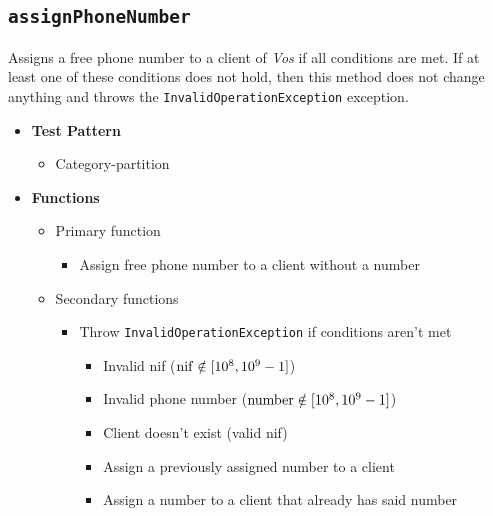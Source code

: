 \subsection{\texttt{assignPhoneNumber}}
\label{sec:methods.assignPhoneNumber}
Assigns a free phone number to a client of \textit{Vos} if all conditions are
met. If at least one of these conditions does not hold, then this method does
not change anything and throws the \texttt{InvalidOperationException} exception.
\begin{itemize}
  \large
  \item \textbf{Test Pattern}
  \begin{itemize}
    \normalsize
    \item Category-partition
  \end{itemize}

  \item \textbf{Functions}
  \begin{itemize}
    \normalsize
    \item Primary function
    \begin{itemize}
      \small
      \item Assign free phone number to a client without a number
    \end{itemize}
    \item Secondary functions
    \begin{itemize}
      \small
      \item Throw \texttt{InvalidOperationException} if conditions aren't met
        \begin{itemize}
          \footnotesize
          \item Invalid nif ($\rm{nif} \notin [10^8,10^9-1]$)
          \item Invalid phone number ($\rm{number} \notin [10^8,10^9-1]$)
          \item Client doesn't exist (valid nif)
          \item Assign a previously assigned number to a client
          \item Assign a number to a client that already has said number
        \end{itemize}
    \end{itemize}
  \end{itemize}


\end{itemize}
